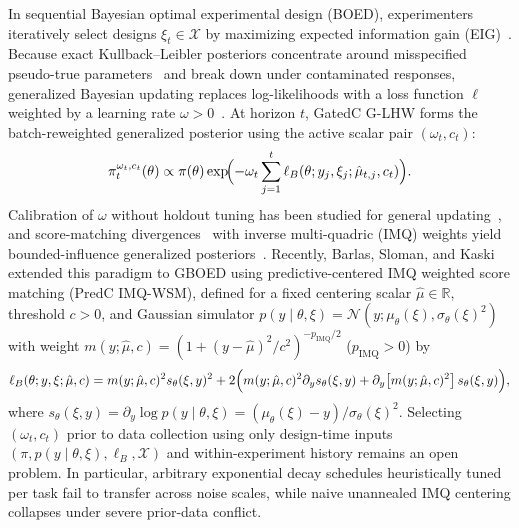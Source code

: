 \documentclass[11pt,a4paper,reqno]{amsart}
\theoremstyle{definition}
\theoremstyle{remark}
\newcommand{\R}{\mathbb{R}}
\newcommand{\Ncal}{\mathcal{N}}
\newcommand{\Xcal}{\mathcal{X}}
\begin{document}
In sequential Bayesian optimal experimental design (BOED), experimenters iteratively select designs $\xi_t \in \Xcal$ by maximizing expected information gain (EIG)~\cite{lindley1956measure,rainforth2024modern,overstall2020acebayes}. Because exact Kullback--Leibler posteriors concentrate around misspecified pseudo-true parameters~\cite{grunwald2017inconsistency} and break down under contaminated responses, generalized Bayesian updating replaces log-likelihoods with a loss function $\ell$ weighted by a learning rate $\omega > 0$~\cite{bissiri2016general,knoblauch2022optimization,jewson2022loss}. At horizon $t$, GatedC G-LHW forms the batch-reweighted generalized posterior using the active scalar pair $(\omega_t, c_t)$:
\[
\pi_t^{\omega_t, c_t}(\theta) \propto \pi(\theta)\exp\!\Bigl(-\omega_t \sum_{j=1}^t \ell_B(\theta; y_j, \xi_j; \hat{\mu}_{t,j}, c_t)\Bigr).
\]
Calibration of $\omega$ without holdout tuning has been studied for general updating~\cite{lyddon2019general,wu2023comparison,grunwald2017inconsistency}, and score-matching divergences~\cite{hyvarinen2005score,barp2019minimum} with inverse multi-quadric (IMQ) weights yield bounded-influence generalized posteriors~\cite{altamirano2024rcgp,laplante2025strcgp}. Recently, Barlas, Sloman, and Kaski~\cite{barlas2025gboed} extended this paradigm to GBOED using predictive-centered IMQ weighted score matching (PredC IMQ-WSM), defined for a fixed centering scalar $\hat{\mu} \in \R$, threshold $c > 0$, and Gaussian simulator $p(y \mid \theta, \xi) = \Ncal(y; \mu_\theta(\xi), \sigma_\theta(\xi)^2)$ with weight $m(y; \hat{\mu}, c) = (1 + (y - \hat{\mu})^2 / c^2)^{-p_{\mathrm{IMQ}}/2}$ ($p_{\mathrm{IMQ}} > 0$) by
\begin{equation}\label{eq:predc_loss_def}
\ell_B(\theta; y, \xi; \hat{\mu}, c)
= m(y; \hat{\mu}, c)^2 s_\theta(\xi, y)^2 + 2\Bigl(m(y; \hat{\mu}, c)^2 \partial_y s_\theta(\xi, y) + \partial_y\bigl[m(y; \hat{\mu}, c)^2\bigr]\,s_\theta(\xi, y)\Bigr),
\end{equation}
where $s_\theta(\xi, y) = \partial_y \log p(y \mid \theta, \xi) = (\mu_\theta(\xi) - y)/\sigma_\theta(\xi)^2$. Selecting $(\omega_t, c_t)$ prior to data collection using only design-time inputs $(\pi, p(y \mid \theta, \xi), \ell_B, \Xcal)$ and within-experiment history remains an open problem. In particular, arbitrary exponential decay schedules heuristically tuned per task fail to transfer across noise scales, while naive unannealed IMQ centering collapses under severe prior-data conflict.
\end{document}
